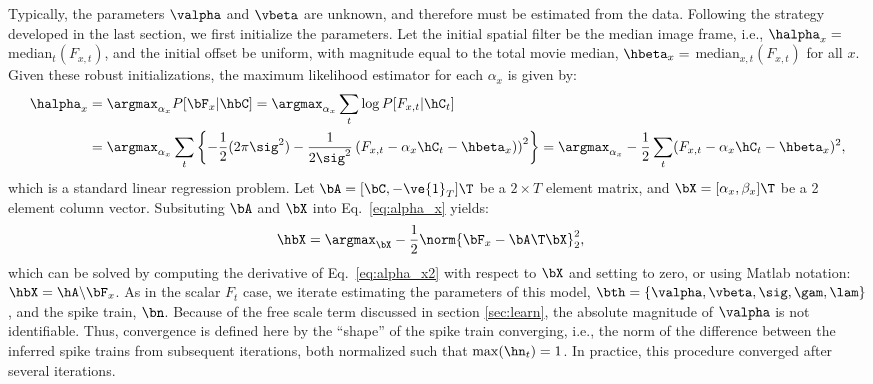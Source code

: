 Typically, the parameters  $\valpha$ and $\vbeta$ are unknown, and therefore must be estimated from the data.  Following the strategy developed in the last section, we first initialize the parameters.  Let the initial spatial filter be the median image frame, i.e., $\halpha_x=$ median$_t(F_{x,t})$, and the initial offset be uniform, with magnitude equal to the total movie median, $\hbeta_x=$ median$_{x,t}(F_{x,t})$ for all $x$.  Given these robust initializations, the maximum likelihood estimator for each $\alpha_x$ is given by:
\begin{subequations} \label{eq:valpha_x}
\begin{align}
\halpha_x &= \argmax_{\alpha_x} P[\bF_x | \hbC] = \argmax_{\alpha_x} \sum_t \log P[F_{x,t} | \hC_t] \\
&=\argmax_{\alpha_x} \sum_t  \left\{-\frac{1}{2} (2\pi \sig^2) - \frac{1}{2\sig^2}\left(F_{x,t} - \alpha_x \hC_t - \hbeta_x)\right)^2 \right\} %
= \argmax_{\alpha_x} -\frac{1}{2} \sum_t  (F_{x,t} - \alpha_x \hC_t - \hbeta_x)^2, \label{eq:alpha_x}
\end{align}
\end{subequations}
which is a standard linear regression problem.  Let $\bA=[\bC, -\ve{1}_T]\T$ be a $2\times T$ element matrix, and $\bX=[\alpha_x, \beta_x]\T$ be a 2 element column vector.  Subsituting $\bA$ and $\bX$ into Eq.~\eqref{eq:alpha_x} yields:
\begin{align}
\hbX &= \argmax_{\bX} -\frac{1}{2} \norm{\bF_{x} - \bA\T \bX}_2^2, \label{eq:alpha_x2}
\end{align}
which can be solved by computing the derivative of Eq.~\eqref{eq:alpha_x2} with respect to $\bX$ and setting to zero, or using Matlab notation: $\hbX = \hA \backslash \bF_x$. %
As in the scalar $F_t$ case, we iterate estimating the parameters of this model, $\bth = \{\valpha, \vbeta, \sig, \gam, \lam\}$, and the spike train, $\bn$.  Because of the free scale term discussed in section \ref{sec:learn}, the absolute magnitude of $\valpha$ is not identifiable.  Thus, convergence is defined here by the ``shape'' of the spike train converging, i.e., the norm of the difference between the inferred spike trains from subsequent iterations, both normalized such that $\max(\hn_t)=1$.  In practice, this procedure converged after several iterations.



